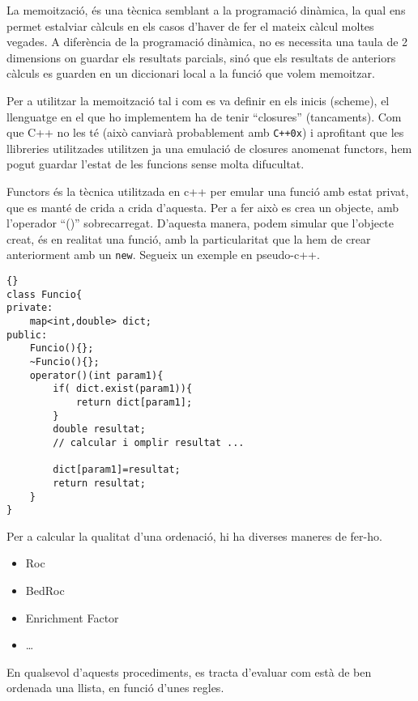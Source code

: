 \documentclass[titlepage,a4paper,12pt]{book}
\begin{document}
La memoització, és una tècnica semblant a la programació dinàmica, la qual ens
permet estalviar càlculs en els casos d'haver de fer el mateix càlcul moltes
vegades.  A diferència de la programació dinàmica, no es necessita una taula de
2 dimensions on guardar els resultats parcials, sinó que els resultats de
anteriors càlculs es guarden en un diccionari local a la funció que volem
memoitzar.  

Per a utilitzar la memoització tal i com es va definir en els inicis
(scheme), el llenguatge en el que ho implementem ha de tenir ``closures''
(tancaments).  Com que C++ no les té (això canviarà probablement amb
\texttt{C++0x}) %
i aprofitant que les llibreries utilitzades utilitzen ja una emulació de
closures anomenat functors, hem pogut guardar l'estat de les funcions sense
molta difucultat. 

Functors és la tècnica utilitzada en c++ per emular una funció amb estat privat,
que es manté de crida a crida d'aquesta.  Per a fer això es crea un objecte, amb
l'operador ``()'' sobrecarregat.  D'aquesta manera, podem simular que l'objecte
creat, és en realitat una funció, amb la particularitat que la hem de crear
anteriorment amb un \texttt{new}.  Segueix un exemple en pseudo-c++.



\lstset{language=c++,
	tabsize=2}
\lstset{commentstyle=\textit}

\begin{lstlisting}[frame=trbl]{}
class Funcio{
private:
	map<int,double> dict;
public:
	Funcio(){};
	~Funcio(){};
	operator()(int param1){
		if( dict.exist(param1)){
			return dict[param1];
		}
		double resultat;
		// calcular i omplir resultat ...

		dict[param1]=resultat;
		return resultat;
	}
}

\end{lstlisting}


Per a calcular la qualitat d'una ordenació, hi ha diverses maneres de fer-ho.

\begin{itemize}
	\item Roc
	\item BedRoc
	\item Enrichment Factor
	\item \dots
\end{itemize}


En qualsevol d'aquests procediments, es tracta d'evaluar com està de ben ordenada una llista, en funció d'unes regles.
\end{document}
